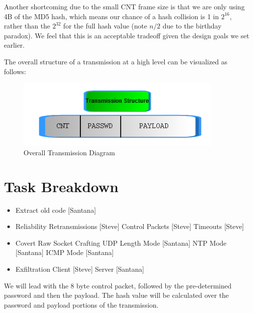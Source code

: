 \documentclass[titlepage]{article}
\begin{document}
Another shortcoming due to the small CNT frame size is that we are only using 4B of the MD5 hash, which means our chance of a hash collision is 1 in $2^{16}$, rather than the $2^{32}$
for the full hash value (note $n/2$ due to the birthday paradox). We feel that this is an acceptable tradeoff given the design goals we set earlier.

The overall structure of a transmission at a high level can be visualized as follows:

\clearpage

\begin{figure}[htb]                                                                       
  \begin{center}
    \includegraphics[width=0.9\textwidth]{imgs/transmission.png}
  \end{center}
  \caption{Overall Transmission Diagram}
  \label{fig:transmission}
\end{figure}

\clearpage

\section{Task Breakdown}

\begin{itemize}
	\item Extract old code [Santana]
	\item Reliability
	\subitem Retransmissions [Steve]
	\subitem Control Packets [Steve]
	\subitem Timeouts [Steve]
	\item Covert Raw Socket Crafting
	\subitem UDP Length Mode [Santana]
	\subitem NTP Mode [Santana]
	\subitem ICMP Mode [Santana]
	\item Exfiltration
	\subitem Client [Steve]
	\subitem Server [Santana]
\end{itemize}

We will lead with the 8 byte control packet, followed by the pre-determined password and then the payload. The hash value will be calculated over the password and payload
portions of the transmission.
\end{document}
